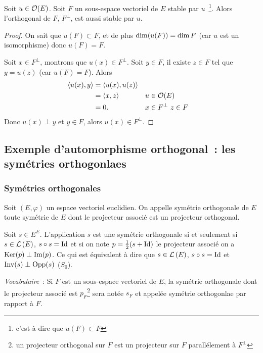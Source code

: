 \begin{prop}
  Soit \(u \in \mathcal{O}\!\left(E\right)\). Soit \(F\) un sous-espace vectoriel de \(E\) stable 
  par \(u\)~\footnote{c'est-à-dire que \(u(F)\subset F\)}. Alors l'orthogonal de 
  \(F\), \(F^\perp\), est aussi stable par \(u\).
\end{prop}
\begin{proof}
  On sait que \(u(F) \subset F\), et de plus \(\operatorname{dim}(u(F)) = \operatorname{dim} F\) (car \(u\) 
  est un isomorphisme) donc \(u(F)=F\).

  Soit \(x \in F^\perp\), montrons que \(u(x) \in F^\perp\). Soit \(y \in F\), 
  il existe \(z \in F\) tel que \(y=u(z)\) (car \(u(F)=F\)). Alors
  \begin{align*}
    \left\langle{u(x)},{y}\right\rangle &= \left\langle{u(x)},{u(z)}\right\rangle \\
    &= \left\langle{x},{z}\right\rangle && u \in \mathcal{O}\!\left(E\right) \\
    &=0. && x \in F^\perp \ z \in F
  \end{align*}
  Donc \(u(x) \perp y\) et \(y \in F\), alors \(u(x) \in F^\perp\).
\end{proof}

\subsection{Exemple d'automorphisme orthogonal~: les symétries orthogonlaes}

\subsubsection{Symétries orthogonales}

\begin{defdef}
  Soit \((E,\varphi)\) un espace vectoriel euclidien. On appelle symétrie 
  orthogonale de \(E\) toute symétrie de \(E\) dont le projecteur associé est un 
  projecteur orthogonal.
\end{defdef}

Soit \(s \in E^E\). L'application \(s\) est une symétrie orthogonale si et 
seulement si \(s \in \mathcal{L}\left(E\right)\), \(s \circ s = \operatorname{Id}\) et si on note 
\(p=\frac{1}{2}(s+\operatorname{Id})\) le projecteur associé on a \(\operatorname{Ker}(p) \perp \operatorname{Im}(p)\). 
Ce qui est équivalent à dire que \(s \in \mathcal{L}\left(E\right)\), \(s \circ s = \operatorname{Id}\) et 
\(\operatorname{Inv}(s)\perp \operatorname{Opp}(s)\) (\(S_0\)).

\emph{Vocabulaire}~: Si \(F\) est un sous-espace vectoriel de \(E\), la symétrie 
orthogonale dont le projecteur associé est \(p_F\)\footnote{un projecteur 
orthogonal sur \(F\) est un projecteur sur \(F\) parallélement à \(F^\perp\)} 
sera notée \(s_F\) et appelée symétrie orthogonlae par rapport à \(F\).

